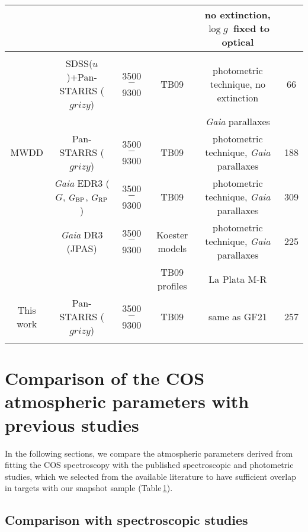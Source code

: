\documentclass[fleqn,usenatbib, useAMS]{mnras}
\newcommand{\logg}{\mbox{$\log g$}}
\begin{document}
\begin{table*}
\begin{tabular}{cccccc}
&&&&no extinction, \logg\ fixed to optical &\\\hline
%
\noalign{\smallskip}
\multicolumn{6}{c}{Photometry}\\
\noalign{\smallskip}
\hline
\cite{Kilic2020} &	SDSS($u$)+Pan-STARRS ($grizy$)	&	3500$-$9300	&	TB09	&	photometric technique, no extinction	&	66	\\
&&&&\textit{Gaia} parallaxes &		\\
MWDD \citep{mwdd}	&	Pan-STARRS ($grizy$) &	3500$-$9300	& TB09	&	photometric technique, \textit{Gaia} parallaxes &	188	\\
\cite{nicola2021} &	\textit{Gaia} EDR3 ($G$, $G\rm{_{BP}}$, $G\rm{_{RP}}$)	&	3500$-$9300	& TB09	& photometric technique, \textit{Gaia} parallaxes & 309\\
\cite{Esteban2022} &	\textit{Gaia} DR3 (JPAS) &	3500$-$9300	& Koester models & photometric technique, \textit{Gaia} parallaxes & 225\\
&	&	& TB09 profiles	& La Plata M-R  & \\
This work	&	Pan-STARRS ($grizy$)	&	3500$-$9300	&	TB09	&	same as GF21	&	257\\
\hline
\label{tab:compare_table}
\end{tabular}
\end{table*}

\section{Comparison of the COS atmospheric parameters with previous studies}\label{sec:comp}

In the following sections, we compare the atmospheric parameters derived from fitting the COS spectroscopy with the published spectroscopic and photometric studies, which we selected from the available literature to have sufficient overlap in targets with our snapshot sample (Table\,\ref{tab:compare_table}).  

\subsection{Comparison with spectroscopic studies}
\end{document}
